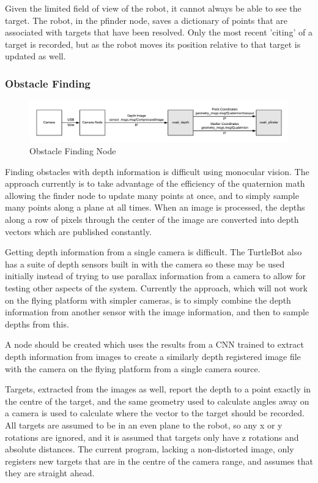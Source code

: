 \documentclass{article}[12]
\begin{document}
	Given the limited field of view of the robot, it cannot always be able to see the target. The robot, in the pfinder node, saves a dictionary of points that are associated with targets that have been resolved. Only the most recent 'citing' of a target is recorded, but as the robot moves its position relative to that target is updated as well.
	
	\subsubsection{Obstacle Finding}
	
	\begin{figure}[H]
		\centering
		\includegraphics[width=0.9\linewidth]{DepthDiagram.png}
		\caption{Obstacle Finding Node}
		\label{fig:obstacle}
	\end{figure}

	Finding obstacles with depth information is difficult using monocular vision. The approach currently is to take advantage of the efficiency of the quaternion math allowing the finder node to update many points at once, and to simply sample many points along a plane at all times. When an image is processed, the depths along a row of pixels through the center of the image are converted into depth vectors which are published constantly. 
	
	Getting depth information from a single camera is difficult. The TurtleBot also has a suite of depth sensors built in with the camera so these may be used initially instead of trying to use parallax information from a camera to allow for testing other aspects of the system. Currently the approach, which will not work on the flying platform with simpler cameras, is to simply combine the depth information from another sensor with the image information, and then to sample depths from this.
	
	A node should be created which uses the results from a CNN trained to extract depth information from images to create a similarly depth registered image file with the camera on the flying platform from a single camera source.
	
	Targets, extracted from the images as well, report the depth to a point exactly in the centre of the target, and the same geometry used to calculate angles away on a camera is used to calculate where the vector to the target should be recorded. All targets are assumed to be in an even plane to the robot, so any x or y rotations are ignored, and it is assumed that targets only have z rotations and absolute distances. The current program, lacking a non-distorted image, only registers new targets that are in the centre of the camera range, and assumes that they are straight ahead.
 
\end{document}
